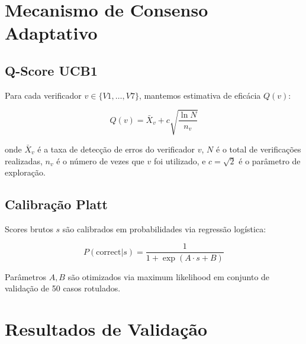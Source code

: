 \documentclass[12pt,a4paper,sumario=tradicional]{abntex2}
\begin{document}
\section{Mecanismo de Consenso Adaptativo}

\subsection{Q-Score UCB1}

Para cada verificador $v \in \{V1, \ldots, V7\}$, mantemos estimativa de eficácia $Q(v)$:

\begin{equation}
    Q(v) = \bar{X}_v + c \sqrt{\frac{\ln N}{n_v}}
\end{equation}

onde $\bar{X}_v$ é a taxa de detecção de erros do verificador $v$, $N$ é o total de verificações realizadas, $n_v$ é o número de vezes que $v$ foi utilizado, e $c = \sqrt{2}$ é o parâmetro de exploração.

\subsection{Calibração Platt}

Scores brutos $s$ são calibrados em probabilidades via regressão logística:

\begin{equation}
    P(\text{correct}|s) = \frac{1}{1 + \exp(A \cdot s + B)}
\end{equation}

Parâmetros $A, B$ são otimizados via maximum likelihood em conjunto de validação de 50 casos rotulados.

\section{Resultados de Validação}
\end{document}
